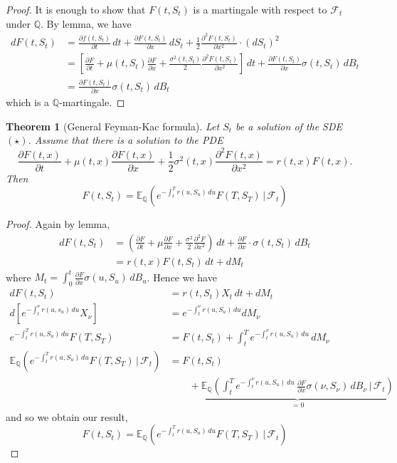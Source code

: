 \documentclass[10pt, oneside, reqno]{amsart}
\theoremstyle{plain}%
\newtheorem{thm}{Theorem}[section]
\theoremstyle{definition}
\theoremstyle{remark}
\newcommand{\given}{ \, | \,}
\newcommand{\Q}{\mathbb{Q}}
\newcommand{\E}{\mathbb{E}}
\newcommand{\sigf}{\mathcal{F}}
\begin{document}
\begin{proof}
	It is enough to show that $F(t, S_t)$ is a martingale with respect to $\sigf_t$ under $\Q$.  By \itos lemma, we have \begin{align*}
		dF(t, S_t) &= \frac{\partial f(t, S_t)}{\partial t} \, dt + \frac{\partial F(t, S_t)}{\partial x} \, dS_t + \frac{1}{2} \frac{\partial^2 F(t, S_t)}{\partial x^2} \cdot (dS_t)^2 \\
		&= \left[ \frac{\partial F}{\partial t} + \mu(t, S_t) \frac{\partial F}{\partial x} + \frac{\sigma^2(t, S_t)}{2} \frac{\partial^2 F(t, S_t)}{\partial x^2} \right] \, dt + \frac{\partial F(t, S_t)}{\partial x} \sigma(t, S_t) \, dB_t \\
		&= \frac{\partial F(t, S_t)}{\partial x} \sigma(t, S_t) \, dB_t
	\end{align*} which is a $\Q$-martingale.
\end{proof}

\begin{thm}[General Feyman-Kac formula]
	Let $S_t$ be a solution of the SDE $(\star)$.  Assume that there is a solution to the PDE \[
		\frac{\partial F(t, x)}{\partial t} + \mu(t, x) \frac{\partial F(t, x)}{\partial x} + \frac{1}{2} \sigma^2(t, x) \frac{\partial^2 F(t, x)}{\partial x^2} = r(t, x) F(t, x).
	\]  Then \[
		F(t, S_t) = \E_\Q\left( e^{-\int_t^T r(u, S_u) \, du} F(T, S_T) \given \sigf_t \right)
	\]
\end{thm}

\begin{proof}
	Again by \itos lemma, \begin{align*}
		dF(t, S_t) &= \left( \frac{\partial F}{\partial t} + \mu \frac{\partial F}{\partial x} + \frac{\sigma^2}{2} \frac{\partial^2 F}{\partial x^2} \right) \, dt + \frac{\partial F}{\partial x} \cdot \sigma(t, S_t) \, dB_t \\
		&= r(t, x) F(t, S_t)\, dt + dM_t
	\end{align*}  
	where $M_t = \int_0^t \frac{\partial F}{\partial x} \sigma(u, S_u) \, dB_u$.  Hence we have \begin{align*}
		dF(t, S_t) 	&= r(t, S_t) X_t \, dt + dM_t \\
\tag{$\Rightarrow$}		d\left[ e^{-\int_t^\nu r(u, s_u)\, du} X_\nu \right] &= e^{-\int_t^\nu r(u, S_u) \, du} dM_\nu \\
\tag{$\Rightarrow$}		e^{-\int_t^T r(u, S_u) \, du} F(T, S_T) &= F(t, S_t) + \int_t^T e^{-\int_t^\nu r(u, S_u)\, du} \, dM_\nu  \\
\tag{$\Rightarrow$}	 	\E_\Q \left(	e^{-\int_t^T r(u, S_u) \, du} F(T, S_T) \given \sigf_t \right) &= F(t, S_t) \\
			&\qquad +  \underbrace{\E_\Q \left( \int_t^T e^{-\int_t^\nu r(u, S_u)\, du} \, \frac{\partial F}{\partial x} \sigma(\nu, S_\nu) \, dB_\nu \given \sigf_t \right)}_{= 0} 
	\end{align*} and so we obtain our result, \[
		F(t, S_t) = \E_\Q\left( e^{-\int_t^T r(u, S_u) \, du} F(T, S_T) \given \sigf_t \right)
	\]
\end{proof}
\end{document}
